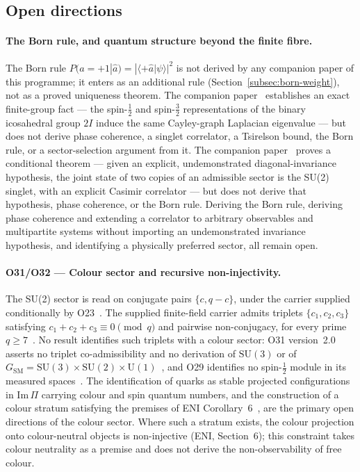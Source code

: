 \documentclass[11pt,a4paper]{article}
\begin{document}
  \subsection*{Open directions}

    \paragraph{The Born rule, and quantum structure beyond the finite fibre.}
      The Born rule $P(a=+1|\hat{a}) = |\langle +\hat{a}|\psi\rangle|^2$ is not
      derived by any companion paper of this programme; it enters as an additional rule
      (Section~\ref{subsec:born-weight}), not as a proved uniqueness theorem.
      The companion paper~\cite{Beau2026q2} establishes an exact finite-group fact
      — the spin-$\tfrac12$ and spin-$\tfrac32$ representations of the binary
      icosahedral group $2I$ induce the same Cayley-graph Laplacian eigenvalue —
      but does not derive phase coherence, a singlet correlator, a Tsirelson bound,
      the Born rule, or a sector-selection argument from it.
      The companion
      paper~\cite{Beau2026q3} proves a conditional theorem — given an explicit,
      undemonstrated diagonal-invariance hypothesis, the joint state of two copies
      of an admissible sector is the SU(2) singlet, with an explicit Casimir
      correlator — but does not derive that hypothesis, phase coherence, or the
      Born rule.
      Deriving the Born rule, deriving phase coherence and extending a
      correlator to arbitrary observables and multipartite systems without
      importing an undemonstrated invariance hypothesis, and identifying a
      physically preferred sector, all remain open.

    \paragraph{O31/O32 --- Colour sector and recursive non-injectivity.}
      The SU(2) sector is read on conjugate pairs $\{c, q-c\}$, under the carrier supplied
      conditionally by O23~\cite{Beau2026a27}.
      The supplied finite-field carrier admits triplets
      $\{c_1, c_2, c_3\}$ satisfying $c_1 + c_2 + c_3 \equiv 0 \pmod{q}$
      and pairwise non-conjugacy, for every prime $q \geq 7$~\cite{Beau2026a35}.
      No result identifies such triplets with a colour sector: O31 version~2.0 asserts no
      triplet co-admissibility and no derivation of $\mathrm{SU}(3)$ or of
      $G_{\mathrm{SM}} = \mathrm{SU}(3) \times \mathrm{SU}(2) \times \mathrm{U}(1)$~\cite{Beau2026a35},
      and O29 identifies no spin-$\tfrac{1}{2}$ module in its measured spaces~\cite{Beau2026a33}.
      The identification of quarks as stable projected configurations in
      $\mathrm{Im}\,\Pi$ carrying colour and spin quantum numbers, and the construction of a
      colour stratum satisfying the premises of ENI Corollary~6~\cite{Beau2026l}, are the primary
      open directions of the colour sector.
      Where such a stratum exists, the colour projection onto colour-neutral objects is
      non-injective (ENI, Section~6); this constraint takes colour neutrality as a premise and
      does not derive the non-observability of free colour.
\end{document}
